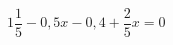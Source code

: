 \begin{ex}
	\begin{condition}
		\( 1\dfrac{1}{5}-0,5x-0,4+\dfrac{2}{5}x=0 \)
	\end{condition}
\end{ex}